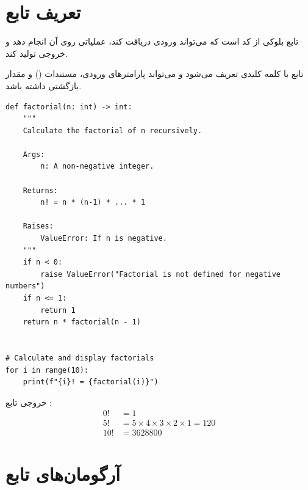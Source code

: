 \documentclass{matinbook}
\begin{document}
\section{تعریف تابع}

تابع بلوکی از کد است که
می‌تواند ورودی دریافت کند، عملیاتی
روی آن انجام دهد و خروجی تولید کند.

\begin{definition}
    تابع با کلمه کلیدی  تعریف می‌شود
    و می‌تواند پارامترهای ورودی، مستندات
    () و مقدار بازگشتی داشته باشد.
    \label{def:function}
\end{definition}

\begin{latin}
\begin{verbatim}
def factorial(n: int) -> int:
    """
    Calculate the factorial of n recursively.
    
    Args:
        n: A non-negative integer.
    
    Returns:
        n! = n * (n-1) * ... * 1
    
    Raises:
        ValueError: If n is negative.
    """
    if n < 0:
        raise ValueError("Factorial is not defined for negative numbers")
    if n <= 1:
        return 1
    return n * factorial(n - 1)


# Calculate and display factorials
for i in range(10):
    print(f"{i}! = {factorial(i)}")
\end{verbatim}
\end{latin}
\label{code:factorial}

\begin{example}
    خروجی تابع :
    \begin{align*}
        0! &= 1 \\
        5! &= 5 \times 4 \times 3 \times 2 \times 1 = 120 \\
        10! &= 3628800
    \end{align*}
    \label{ex:factorial-values}
\end{example}

\section{آرگومان‌های تابع}
\end{document}
